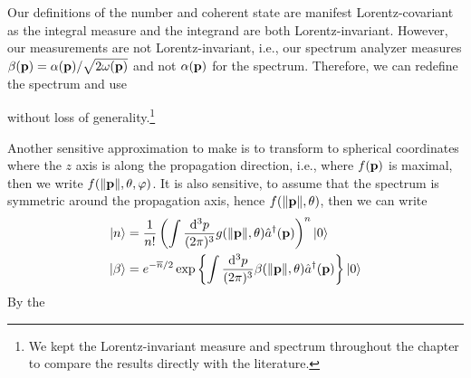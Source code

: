 Our definitions of the number and coherent state are manifest Lorentz-covariant as the integral measure and the integrand are both Lorentz-invariant.
However, our measurements are not Lorentz-invariant, i.e., our spectrum analyzer measures $\beta(\vb{p})=\alpha(\vb{p})/\sqrt{2\omega(\vb{p})}$ and not $\alpha(\vb{p})$ for the spectrum.
Therefore, we can redefine the spectrum and use

without loss of generality.\footnote{We kept the Lorentz-invariant measure and spectrum throughout the chapter to compare the results directly with the literature.}

Another sensitive approximation to make is to transform to spherical coordinates where the $z$ axis is along the propagation direction, i.e., where $f(\vb{p})$ is maximal, then we write $f(\norm{\vb{p}},\theta,\varphi)$.
It is also sensitive, to assume that the spectrum is symmetric around the propagation axis, hence $f(\norm{\vb{p}},\theta)$, then we can write
\begin{align}
	\ket{n}
	&=
	\frac{1}{n!}
	\left(
		\int\frac{\dd[3]{p}}{(2\pi)^3}
		g(\norm{\vb{p}},\theta)
		\hat{a}^\dagger(\vb{p})
	\right)^n
	\ket{0}
	\\
	\ket{\beta}
	&=
	e^{-\overline{n}/2}
	\exp\left\{
		\int\frac{\dd[3]{p}}{(2\pi)^3}
		\beta(\norm{\vb{p}},\theta)
		\hat{a}^\dagger(\vb{p})
	\right\}
	\ket{0}
\end{align}
By the 